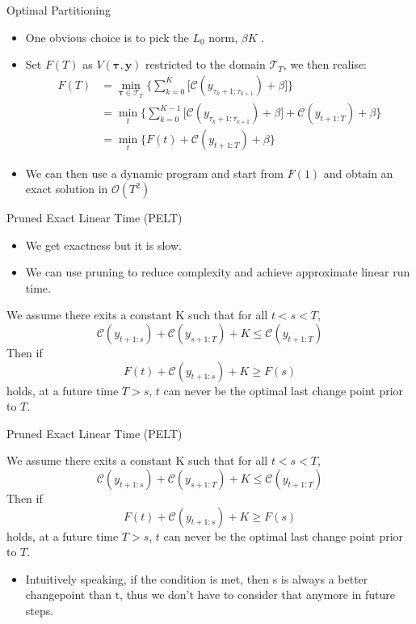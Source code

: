 \documentclass{beamer}
\begin{document}
\begin{frame}{Optimal Partitioning}
    \begin{itemize}
        \item One obvious choice is to pick the $L_0$ norm, $\beta K$ .
        \item Set $F(T)$ as $V(\bm{\tau}, \mathbf{y})$ restricted to the domain $\mathcal{T}_{T}$, we then realise:
        \begin{align}
        F(T) &= \min_{\bm{\tau} \in \mathcal{T}_T} \bigg\{
        \sum_{k = 0}^K\big[  \mathcal{C}(y_{\tau_k+1:\tau_{k+1}}) + \beta \big] \bigg\} \\
         &= \min_{t} \bigg\{ \sum_{k = 0}^{K-1}\big[  \mathcal{C}(y_{\tau_k+1:\tau_{k+1}}) + \beta \big] + \mathcal{C}(y_{t+1:T}) + \beta \bigg\} \\
         &= \min_{t} \{F(t) + \mathcal{C}(y_{t+1:T}) + \beta \}
\end{align}
    \item We can then use a dynamic program and start from $F(1)$ and obtain an exact solution in $\mathcal{O}(T^2)$
    \end{itemize}
\end{frame}

\begin{frame}{Pruned Exact Linear Time (PELT)}
    \begin{itemize}
        \item We get exactness but it is slow.  \pause
        \item We can use pruning to reduce complexity and achieve approximate linear run time. 
    \end{itemize}
\pause
\begin{theorem}
We assume there exits a constant K such that for all $t < s < T$,
$$\mathcal{C}(y_{t+1:s}) + \mathcal{C}(y_{s+1:T}) + K \leq \mathcal{C}(y_{t+1:T})$$
\noindent Then if 
$$F(t) + \mathcal{C}(y_{t+1:s}) + K \geq F(s) $$
\noindent holds, at a future time $T > s$, $t$ can never be the optimal last change point prior to $T$.
\end{theorem} 
\end{frame}

\begin{frame}{Pruned Exact Linear Time (PELT)}
    \begin{theorem}
We assume there exits a constant K such that for all $t < s < T$,
$$\mathcal{C}(y_{t+1:s}) + \mathcal{C}(y_{s+1:T}) + K \leq \mathcal{C}(y_{t+1:T})$$
\noindent Then if 
$$F(t) + \mathcal{C}(y_{t+1:s}) + K \geq F(s) $$
\noindent holds, at a future time $T > s$, $t$ can never be the optimal last change point prior to $T$.
\end{theorem} 
\begin{itemize}
    \item Intuitively speaking, if the condition is met, then s is always a better changepoint than t, thus we don't have to consider that anymore in future steps.
\end{itemize}
\end{frame}
\end{document}
